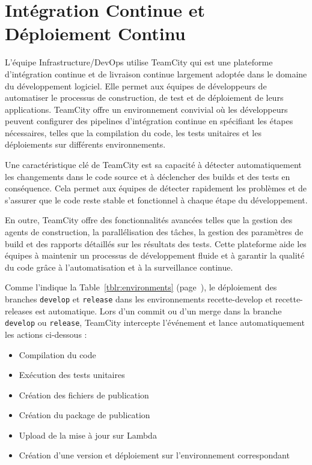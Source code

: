 \section{Intégration Continue et Déploiement Continu}\label{sec:ci-cd}

L'équipe Infrastructure/DevOps utilise TeamCity qui est une plateforme d'intégration continue et de livraison continue largement adoptée dans le domaine du développement logiciel. Elle permet aux équipes de développeurs de automatiser le processus de construction, de test et de déploiement de leurs applications. TeamCity offre un environnement convivial où les développeurs peuvent configurer des pipelines d'intégration continue en spécifiant les étapes nécessaires, telles que la compilation du code, les tests unitaires et les déploiements sur différents environnements.

Une caractéristique clé de TeamCity est sa capacité à détecter automatiquement les changements dans le code source et à déclencher des builds et des tests en conséquence. Cela permet aux équipes de détecter rapidement les problèmes et de s'assurer que le code reste stable et fonctionnel à chaque étape du développement.

En outre, TeamCity offre des fonctionnalités avancées telles que la gestion des agents de construction, la parallélisation des tâches, la gestion des paramètres de build et des rapports détaillés sur les résultats des tests. Cette plateforme aide les équipes à maintenir un processus de développement fluide et à garantir la qualité du code grâce à l'automatisation et à la surveillance continue.

Comme l'indique la Table~\ref{tblr:environments} (page~\pageref{tblr:environments}), le déploiement des branches \Verb|develop| et \Verb|release| dans les environnements recette-develop et recette-releases est automatique. Lors d'un commit ou d'un merge dans la branche \Verb|develop| ou \Verb|release|, TeamCity intercepte l'événement et lance automatiquement les actions ci-dessous :

\begin{itemize}
    \item Compilation du code
    \item Exécution des tests unitaires
    \item Création des fichiers de publication
    \item Création du package de publication
    \item Upload de la mise à jour sur Lambda
    \item Création d'une version et déploiement sur l'environnement correspondant
\end{itemize}

